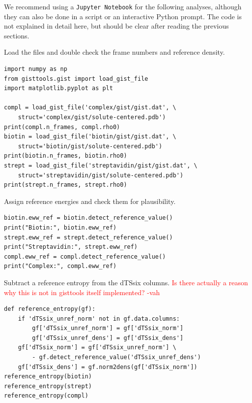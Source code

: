 \documentclass[9pt,tutorial]{livecoms}
\newcommand{\software}{\texttt}
\newcommand{\todo}{\textcolor{red}}
\begin{document}
We recommend using a \software{Jupyter Notebook} for the following analyses, although they can also be done in a script or an interactive Python prompt.
The code is not explained in detail here, but should be clear after reading the previous sections.

Load the files and double check the frame numbers and reference density.
\begin{lstlisting}[style=python]
import numpy as np
from gisttools.gist import load_gist_file
import matplotlib.pyplot as plt

compl = load_gist_file('complex/gist/gist.dat', \
    struct='complex/gist/solute-centered.pdb')
print(compl.n_frames, compl.rho0)
biotin = load_gist_file('biotin/gist/gist.dat', \
    struct='biotin/gist/solute-centered.pdb')
print(biotin.n_frames, biotin.rho0)
strept = load_gist_file('streptavidin/gist/gist.dat', \
    struct='streptavidin/gist/solute-centered.pdb')
print(strept.n_frames, strept.rho0)
\end{lstlisting}
Assign reference energies and check them for plausibility.
\begin{lstlisting}[style=python]
biotin.eww_ref = biotin.detect_reference_value()
print("Biotin:", biotin.eww_ref)
strept.eww_ref = strept.detect_reference_value()
print("Streptavidin:", strept.eww_ref)
compl.eww_ref = compl.detect_reference_value()
print("Complex:", compl.eww_ref)
\end{lstlisting}

Subtract a reference entropy from the dTSsix columns.
\todo{Is there actually a reason why this is not in gisttools itself implemented? -vah}
\begin{lstlisting}[style=python]
def reference_entropy(gf):
    if 'dTSsix_unref_norm' not in gf.data.columns:
        gf['dTSsix_unref_norm'] = gf['dTSsix_norm']
        gf['dTSsix_unref_dens'] = gf['dTSsix_dens']
    gf['dTSsix_norm'] = gf['dTSsix_unref_norm'] \
        - gf.detect_reference_value('dTSsix_unref_dens')
    gf['dTSsix_dens'] = gf.norm2dens(gf['dTSsix_norm'])
reference_entropy(biotin)
reference_entropy(strept)
reference_entropy(compl)
\end{lstlisting}
\end{document}
